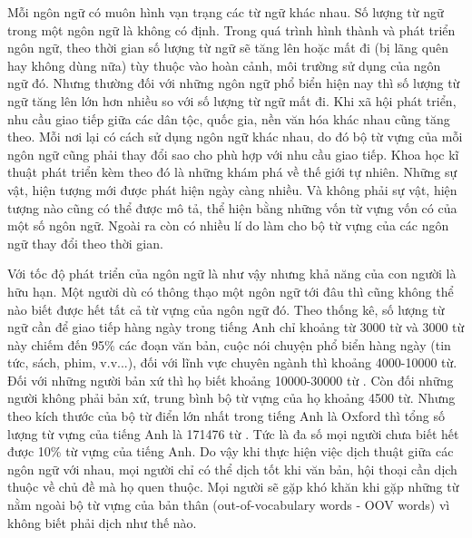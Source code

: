 Mỗi ngôn ngữ có muôn hình vạn trạng các từ ngữ khác nhau. Số lượng từ ngữ trong một ngôn ngữ là không có định. Trong quá trình hình thành và phát triển ngôn ngữ, theo thời gian số lượng từ ngữ sẽ tăng lên hoặc mất đi (bị lãng quên hay không dùng nữa) tùy thuộc vào hoàn cảnh, môi trường sử dụng của ngôn ngữ đó. Nhưng thường đối với những ngôn ngữ phổ biển hiện nay thì số lượng từ ngữ tăng lên lớn hơn nhiều so với số lượng từ ngữ mất đi. Khi xã hội phát triển, nhu cầu giao tiếp giữa các dân tộc, quốc gia, nền văn hóa khác nhau cũng tăng theo. Mỗi nơi lại có cách sử dụng ngôn ngữ khác nhau, do đó bộ từ vựng của mỗi ngôn ngữ cũng phải thay đổi sao cho phù hợp với nhu cầu giao tiếp. Khoa học kĩ thuật phát triển kèm theo đó là những khám phá về thế giới tự nhiên. Những sự vật, hiện tượng mới được phát hiện ngày càng nhiều. Và không phải sự vật, hiện tượng nào cũng có thể được mô tả, thể hiện bằng những vốn từ vựng vốn có của một số ngôn ngữ. Ngoài ra còn có nhiều lí do làm cho bộ từ vựng của các ngôn ngữ thay đổi theo thời gian.

Với tốc độ phát triển của ngôn ngữ là như vậy nhưng khả năng của con người là hữu hạn. Một người dù có thông thạo một ngôn ngữ tới đâu thì cũng không thể nào biết được hết tất cả từ vựng của ngôn ngữ đó. Theo thống kê, số lượng từ ngữ cần để giao tiếp hàng ngày trong tiếng Anh chỉ khoảng từ 3000 từ và 3000 từ này chiếm đến 95\% các đoạn văn bản, cuộc nói chuyện phổ biển hàng ngày (tin tức, sách, phim, v.v...), đối với lĩnh vực chuyên ngành thì khoảng 4000-10000 từ. Đối với những người bản xứ thì họ biết khoảng 10000-30000 từ \cite{VocabReference1ReadingTeacher}. Còn đối những người không phải bản xứ, trung bình bộ từ vựng của họ khoảng 4500 từ. Nhưng theo kích thước của bộ từ điển lớn nhất trong tiếng Anh là Oxford thì tổng số lượng từ vựng của tiếng Anh là 171476 từ \cite{VocabReference2LexicalFacts}. Tức là đa số mọi người chưa biết hết được 10\% từ vựng của tiếng Anh. Do vậy khi thực hiện việc dịch thuật giữa các ngôn ngữ với nhau, mọi người chỉ có thể dịch tốt khi văn bản, hội thoại cần dịch thuộc về chủ đề mà họ quen thuộc. Mọi người sẽ gặp khó khăn khi gặp những từ nằm ngoài bộ từ vựng của bản thân (out-of-vocabulary words - OOV words) vì không biết phải dịch như thế nào.

